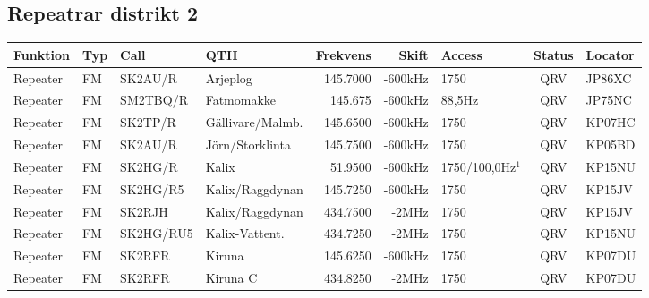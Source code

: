 \begin{landscape}
\subsection{Repeatrar distrikt 2}
\footnotesize
\begin{longtable}{llllrrlcl}
\textbf{Funktion}                 & \textbf{Typ}  & \textbf{Call} & \textbf{QTH}        & \textbf{Frekvens} & \textbf{Skift} & \textbf{Access}  & \textbf{Status} & \textbf{Locator} \\ \hline \endhead
Repeater                          & FM            & SK2AU/R       & Arjeplog            & 145.7000          & -600kHz        & 1750             & QRV             & JP86XC           \\
Repeater                          & FM            & SM2TBQ/R      & Fatmomakke          & 145.675           & -600kHz        & 88,5Hz           & QRV             & JP75NC           \\
Repeater                          & FM            & SK2TP/R       & Gällivare/Malmb.    & 145.6500          & -600kHz        & 1750             & QRV             & KP07HC           \\
Repeater                          & FM            & SK2AU/R       & Jörn/Storklinta     & 145.7500          & -600kHz        & 1750             & QRV             & KP05BD           \\
Repeater                          & FM            & SK2HG/R       & Kalix               & 51.9500           & -600kHz        & 1750/100,0Hz$^1$ & QRV             & KP15NU           \\
Repeater                          & FM            & SK2HG/R5      & Kalix/Raggdynan     & 145.7250          & -600kHz        & 1750             & QRV             & KP15JV           \\
Repeater                          & FM            & SK2RJH        & Kalix/Raggdynan     & 434.7500          & -2MHz          & 1750             & QRV             & KP15JV           \\
Repeater                          & FM            & SK2HG/RU5     & Kalix-Vattent.      & 434.7250          & -2MHz          & 1750             & QRV             & KP15NU           \\
Repeater                          & FM            & SK2RFR        & Kiruna              & 145.6250          & -600kHz        & 1750             & QRV             & KP07DU           \\
Repeater                          & FM            & SK2RFR        & Kiruna C            & 434.8250          & -2MHz          & 1750             & QRV             & KP07DU           \\

\end{longtable}
\end{landscape}
